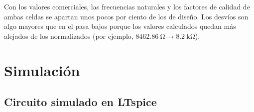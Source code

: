 \begin{table}[!ht]
  \centering
  \caption{Valores calculados y comerciales del filtro pasa altos de 4.\textsuperscript{to} orden.}
  \label{tab:pa-componentes}
\end{table}

Con los valores comerciales, las frecuencias naturales y los factores de calidad de ambas celdas se apartan unos
pocos por ciento de los de diseño. Los desvíos son algo mayores que en el pasa bajos porque los valores calculados
quedan más alejados de los normalizados (por ejemplo, $\SI{8462.86}{\ohm} \rightarrow \SI{8.2}{\kilo\ohm}$).

\section{Simulación}
\label{sec:pa-simulacion}

\subsection{Circuito simulado en LTspice}
\label{subsec:pa-sim-circuito}

